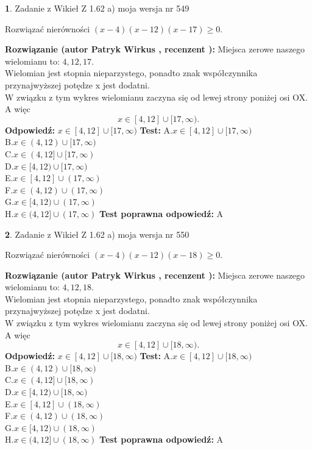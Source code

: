 \documentclass[12pt, a4paper]{article}
\theoremstyle{definition} %
\newtheorem{zad}{}
\newcommand{\zadStart}[1]{\begin{zad}#1\newline}
\newcommand{\zadStop}{\end{zad}}
\newcommand{\rozwStart}[2]{\noindent \textbf{Rozwiązanie (autor #1 , recenzent #2): }\newline}
\newcommand{\rozwStop}{\newline}
\newcommand{\odpStart}{\noindent \textbf{Odpowiedź:}\newline}
\newcommand{\odpStop}{\newline}
\newcommand{\testStart}{\noindent \textbf{Test:}\newline}
\newcommand{\testStop}{\newline}
\newcommand{\kluczStart}{\noindent \textbf{Test poprawna odpowiedź:}\newline}
\newcommand{\kluczStop}{\newline}
\begin{document}
\zadStart{Zadanie z Wikieł Z 1.62 a) moja wersja nr 549}

Rozwiązać nierówności $(x-4)(x-12)(x-17)\ge0$.
\zadStop
\rozwStart{Patryk Wirkus}{}
Miejsca zerowe naszego wielomianu to: $4, 12, 17$.\\
Wielomian jest stopnia nieparzystego, ponadto znak współczynnika przy\linebreak najwyższej potędze x jest dodatni.\\ W związku z tym wykres wielomianu zaczyna się od lewej strony poniżej osi OX. A więc $$x \in [4,12] \cup [17,\infty).$$
\rozwStop
\odpStart
$x \in [4,12] \cup [17,\infty)$
\odpStop
\testStart
A.$x \in [4,12] \cup [17,\infty)$\\
B.$x \in (4,12) \cup [17,\infty)$\\
C.$x \in (4,12] \cup [17,\infty)$\\
D.$x \in [4,12) \cup [17,\infty)$\\
E.$x \in [4,12] \cup (17,\infty)$\\
F.$x \in (4,12) \cup (17,\infty)$\\
G.$x \in [4,12) \cup (17,\infty)$\\
H.$x \in (4,12] \cup (17,\infty)$
\testStop
\kluczStart
A
\kluczStop



\zadStart{Zadanie z Wikieł Z 1.62 a) moja wersja nr 550}

Rozwiązać nierówności $(x-4)(x-12)(x-18)\ge0$.
\zadStop
\rozwStart{Patryk Wirkus}{}
Miejsca zerowe naszego wielomianu to: $4, 12, 18$.\\
Wielomian jest stopnia nieparzystego, ponadto znak współczynnika przy\linebreak najwyższej potędze x jest dodatni.\\ W związku z tym wykres wielomianu zaczyna się od lewej strony poniżej osi OX. A więc $$x \in [4,12] \cup [18,\infty).$$
\rozwStop
\odpStart
$x \in [4,12] \cup [18,\infty)$
\odpStop
\testStart
A.$x \in [4,12] \cup [18,\infty)$\\
B.$x \in (4,12) \cup [18,\infty)$\\
C.$x \in (4,12] \cup [18,\infty)$\\
D.$x \in [4,12) \cup [18,\infty)$\\
E.$x \in [4,12] \cup (18,\infty)$\\
F.$x \in (4,12) \cup (18,\infty)$\\
G.$x \in [4,12) \cup (18,\infty)$\\
H.$x \in (4,12] \cup (18,\infty)$
\testStop
\kluczStart
A
\kluczStop
\end{document}
